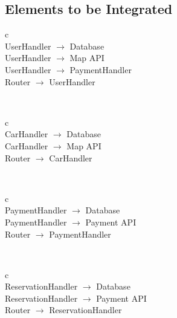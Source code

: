 \subsection{Elements to be Integrated}
    \begin{tabular}{ c }
      \hline
       \\
      \hline
      UserHandler  $ \rightarrow $ Database \\ \hline
      UserHandler $ \rightarrow $ Map API \\ \hline
      UserHandler $ \rightarrow  $ PaymentHandler \\ \hline
      Router $ \rightarrow $ UserHandler \\
      \hline
      \vspace{1mm}
    \end{tabular}
    \\
    \begin{tabular}{ c }
      \hline
       \\
      \hline
      CarHandler $ \rightarrow $ Database \\ \hline
      CarHandler $ \rightarrow $ Map API \\ \hline
      Router $ \rightarrow $ CarHandler \\
      \hline
      \vspace{1mm}
    \end{tabular}
    \\
    \begin{tabular}{ c }
      \hline
       \\
      \hline
      PaymentHandler $ \rightarrow $ Database \\ \hline
      PaymentHandler $ \rightarrow $ Payment API \\ \hline
      Router $ \rightarrow $ PaymentHandler \\
      \hline
      \vspace{1mm}
    \end{tabular}
    \\
    \begin{tabular}{ c }
      \hline
       \\
      \hline
      ReservationHandler $ \rightarrow $ Database \\ \hline
      ReservationHandler $ \rightarrow $ Payment API \\ \hline
      Router $ \rightarrow $ ReservationHandler \\
      \hline
      \vspace{1mm}
    \end{tabular}
